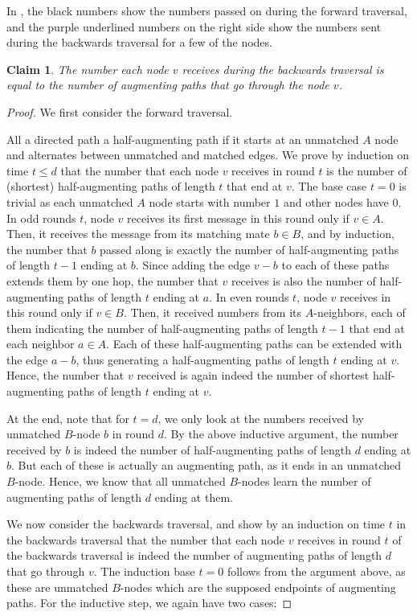 \documentclass[11pt]{article}
\newtheorem{claim}[theorem]{Claim}
\begin{document}
In , the black numbers show the numbers passed on during the forward traversal, and the purple underlined numbers on the right side show the numbers sent during the backwards traversal for a few of the nodes.

\begin{claim}\label{clm:numberTraversals}
The number each node $v$ receives during the backwards traversal is equal to the number of augmenting paths that go through the node $v$.
\end{claim}
\begin{proof}We first consider the forward traversal. 

All a directed path a half-augmenting path if it starts at an unmatched $A$ node and alternates between unmatched and matched edges. We prove by induction on time $t\leq d$ that the number that each node $v$ receives in round $t$ is the number of (shortest) half-augmenting paths of length $t$ that end at $v$. The base case $t=0$ is trivial as each unmatched $A$ node starts with number $1$ and other nodes have $0$. In odd rounds $t$, node $v$ receives its first message in this round only if $v\in A$. Then, it receives the message from its matching mate $b\in B$, and by induction, the number that $b$ passed along is exactly the number of half-augmenting paths of length $t-1$ ending at $b$. Since adding the edge $v-b$ to each of these paths extends them by one hop, the number that $v$ receives is also the number of half-augmenting paths of length $t$ ending at $a$. In even rounds $t$, node $v$ receives in this round only if $v\in B$. Then, it received numbers from its $A$-neighbors, each of them indicating the number of half-augmenting paths of length $t-1$ that end at each neighbor $a\in A$. Each of these half-augmenting paths can be extended with the edge $a-b$, thus generating a half-augmenting paths of length $t$ ending at $v$. Hence, the number that $v$ received is again indeed the number of shortest half-augmenting paths of length $t$ ending at $v$. 

At the end, note that for $t=d$, we only look at the numbers received by unmatched $B$-node $b$ in round $d$. By the above inductive argument, the number received by $b$ is indeed the number of half-augmenting paths of length $d$ ending at $b$. But each of these is actually an augmenting path, as it ends in an unmatched $B$-node. Hence, we know that all unmatched $B$-nodes learn the number of augmenting paths of length $d$ ending at them.

We now consider the backwards traversal, and show by an induction on time $t$ in the backwards traversal that the number that each node $v$ receives in round $t$ of the backwards traversal is indeed the number of augmenting paths of length $d$ that go through $v$. The induction base $t=0$ follows from the argument above, as these are unmatched $B$-nodes which are the supposed endpoints of augmenting paths.
For the inductive step, we again have two cases: 


\end{proof}
\end{document}
